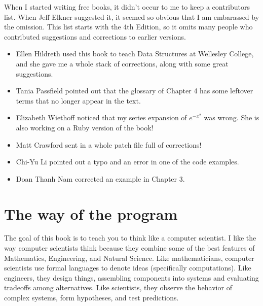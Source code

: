 \documentclass{book}
\newcounter{exercisenum}
\newcommand{\clearemptydoublepage}{\newpage{\pagestyle{empty}\cleardoublepage}}
\newcommand{\beforechapter}{
    \cleardoublepage 
    \setcounter{exercisenum}{0}
}
\begin{document}
When I started writing free books, it didn't occur to me to keep
a contributors list.  When Jeff Elkner suggested it, it seemed so
obvious that I am embarassed by the omission.  This list starts
with the 4th Edition, so it omits many people who contributed
suggestions and corrections to earlier versions.

\begin{itemize}

\item Ellen Hildreth used this book to teach Data Structures at
Wellesley College, and she gave me a whole stack of corrections,
along with some great suggestions.

\item Tania Passfield pointed out that the glossary of Chapter 4
has some leftover terms that no longer appear in the text.

\item Elizabeth Wiethoff noticed that my series expansion of
$e^{-x^2}$ was wrong.  She is also working on a Ruby version of
the book!

\item Matt Crawford sent in a whole patch file full of corrections!

\item Chi-Yu Li pointed out a typo and an error in one of the code
examples.

\item Doan Thanh Nam corrected an example in Chapter 3.

\end{itemize}



\makeatletter
\renewcommand{\l@section}{\@dottedtocline{1}{1.5em}{3.0em}}
\makeatother
\setcounter{tocdepth}{1}

\tableofcontents

\mainmatter

\beforechapter
\chapter{The way of the program}
\label{chap01}

The goal of this book is to teach you to think like a
computer scientist.  I like the way computer scientists think because
they combine some of the best features of Mathematics, Engineering,
and Natural Science.  Like mathematicians, computer scientists use formal
languages to denote ideas (specifically computations).  Like
engineers, they design things, assembling components into systems and
evaluating tradeoffs among alternatives.  Like scientists,
they observe the behavior of complex systems, form hypotheses, and test
predictions.
\end{document}
